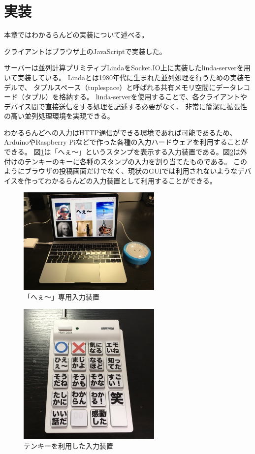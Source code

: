 \section{実装}

本章ではわかるらんどの実装について述べる。

クライアントはブラウザ上のJavaScriptで実装した。

サーバーは並列計算プリミティブLindaをSocket.IO上に実装したlinda-serverを用いて実装している。
Lindaとは1980年代に生まれた並列処理を行うための実装モデルで、
タプルスペース（tuplespace）と呼ばれる共有メモリ空間にデータレコード（タプル）を格納する。
linda-serverを使用することで、各クライアントやデバイス間で直接送信をする処理を記述する必要がなく、
非常に簡潔に拡張性の高い並列処理環境を実現できる。

わかるらんどへの入力はHTTP通信ができる環境であれば可能であるため、ArduinoやRaspberry Piなどで作った各種の入力ハードウェアを利用することができる。
図\ref{button}は「へぇ〜」というスタンプを表示する入力装置である。図\ref{10key}は外付けのテンキーのキーに各種のスタンプの入力を割り当てたものである。
このようにブラウザの投稿画面だけでなく、現状のGUIでは利用されないようなデバイスを作ってわかるらんどの入力装置として利用することができる。

\begin{figure}[h]
\centering
\includegraphics[width=7cm]{images/button.eps}
\caption{「へぇ〜」専用入力装置}
\label{button}
\end{figure}

\begin{figure}[h]
\centering
\includegraphics[width=7cm]{images/10key.eps}
\caption{テンキーを利用した入力装置}
\label{10key}
\end{figure}